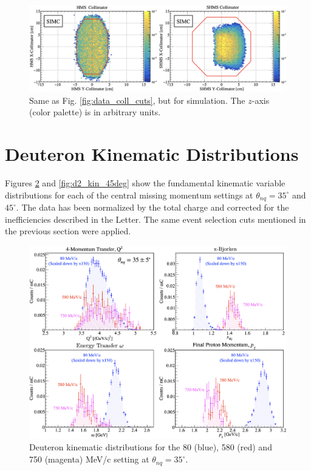 \documentclass[aps, prl]{revtex4-2}  %
\begin{document}
\begin{figure}[!h]
\includegraphics[scale=0.25]{collimator_CUT_80MeV_35deg_SIMC.png}
\caption{Same as Fig. \ref{fig:data_coll_cuts}, but for simulation.  The $z$-axis (color palette) is in arbitrary units.}
\label{fig:simc_coll_cuts}
\end{figure}
\section{\large Deuteron Kinematic Distributions }
\indent Figures \ref{fig:d2_kin_35deg} and \ref{fig:d2_kin_45deg} show the fundamental kinematic variable distributions for each of the
central missing momentum settings at $\theta_{nq}=35^{\circ}$ and $45^{\circ}$. The data has been normalized by the total charge and corrected
for the inefficiencies described in the Letter. The same event selection cuts mentioned in the previous section were applied. 
\begin{figure}[!h]
\includegraphics[scale=0.17]{d2_kin_thnq35.png}
\caption{Deuteron kinematic distributions for the 80 (blue), 580 (red) and 750 (magenta) MeV/c setting at $\theta_{nq}=35^{\circ}$.}
\label{fig:d2_kin_35deg}
\end{figure}
\end{document}
